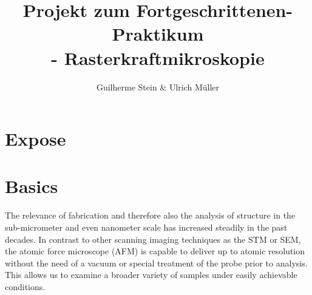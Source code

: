 \documentclass[paper=a4,fontsize=10pt,DIV=18,twocolumn,parskip=half]{scrartcl}
\numberwithin{equation}{section}    %
\begin{document}
\title{Projekt zum Fortgeschrittenen-Praktikum \\ - Rasterkraftmikroskopie}                  
\author{Guilherme Stein \& Ulrich Müller}         
\date{}                                %
\addtocounter{section}{-1}
\section{Expose}

\label{Expose}
\newpage

\section{Basics}
The relevance of fabrication and therefore also the analysis of structure in the 
sub-micrometer and even nanometer scale has increased steadily in the past 
decades. In contrast to other scanning imaging techniques as the STM or SEM, the 
atomic force microscope (AFM) is capable to deliver up to atomic resolution 
without the need of a vacuum or special treatment of the probe prior to 
analysis. This allows us to examine a broader variety of samples under easily 
achievable conditions.
\end{document}
